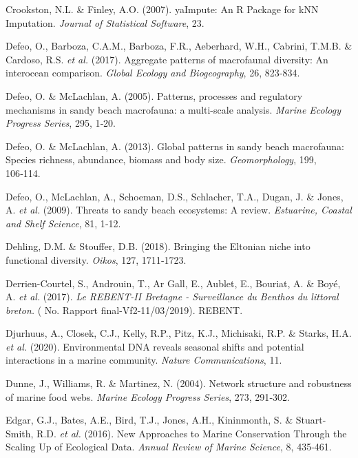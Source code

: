 \documentclass[12pt,]{article}
\newlength{\cslhangindent}
\newenvironment{cslreferences}%
  {\setlength{\parindent}{0pt}%
  \everypar{\setlength{\hangindent}{\cslhangindent}}\ignorespaces}%
  {\par}
\begin{document}
\begin{cslreferences}
\leavevmode\hypertarget{ref-Crookston_2007}{}%
Crookston, N.L. \& Finley, A.O. (2007). yaImpute: An R Package for kNN
Imputation. \emph{Journal of Statistical Software}, 23.

\leavevmode\hypertarget{ref-Defeo_2017}{}%
Defeo, O., Barboza, C.A.M., Barboza, F.R., Aeberhard, W.H., Cabrini,
T.M.B. \& Cardoso, R.S. \emph{et al.} (2017). Aggregate patterns of
macrofaunal diversity: An interocean comparison. \emph{Global Ecology
and Biogeography}, 26, 823‑834.

\leavevmode\hypertarget{ref-Defeo_2005}{}%
Defeo, O. \& McLachlan, A. (2005). Patterns, processes and regulatory
mechanisms in sandy beach macrofauna: a multi-scale analysis.
\emph{Marine Ecology Progress Series}, 295, 1‑20.

\leavevmode\hypertarget{ref-Defeo_2013}{}%
Defeo, O. \& McLachlan, A. (2013). Global patterns in sandy beach
macrofauna: Species richness, abundance, biomass and body size.
\emph{Geomorphology}, 199, 106‑114.

\leavevmode\hypertarget{ref-Defeo_2009}{}%
Defeo, O., McLachlan, A., Schoeman, D.S., Schlacher, T.A., Dugan, J. \&
Jones, A. \emph{et al.} (2009). Threats to sandy beach ecosystems: A
review. \emph{Estuarine, Coastal and Shelf Science}, 81, 1‑12.

\leavevmode\hypertarget{ref-Dehling_2018}{}%
Dehling, D.M. \& Stouffer, D.B. (2018). Bringing the Eltonian niche into
functional diversity. \emph{Oikos}, 127, 1711‑1723.

\leavevmode\hypertarget{ref-Rebent2016}{}%
Derrien-Courtel, S., Androuin, T., Ar Gall, E., Aublet, E., Bouriat, A.
\& Boyé, A. \emph{et al.} (2017). \emph{Le REBENT-II Bretagne -
Surveillance du Benthos du littoral breton.} ( No. Rapport
final-Vf2-11/03/2019). REBENT.

\leavevmode\hypertarget{ref-Djurhuus_2020}{}%
Djurhuus, A., Closek, C.J., Kelly, R.P., Pitz, K.J., Michisaki, R.P. \&
Starks, H.A. \emph{et al.} (2020). Environmental DNA reveals seasonal
shifts and potential interactions in a marine community. \emph{Nature
Communications}, 11.

\leavevmode\hypertarget{ref-Dunne_2004}{}%
Dunne, J., Williams, R. \& Martinez, N. (2004). Network structure and
robustness of marine food webs. \emph{Marine Ecology Progress Series},
273, 291‑302.

\leavevmode\hypertarget{ref-Edgar_2016}{}%
Edgar, G.J., Bates, A.E., Bird, T.J., Jones, A.H., Kininmonth, S. \&
Stuart-Smith, R.D. \emph{et al.} (2016). New Approaches to Marine
Conservation Through the Scaling Up of Ecological Data. \emph{Annual
Review of Marine Science}, 8, 435‑461.


\end{cslreferences}
\end{document}
